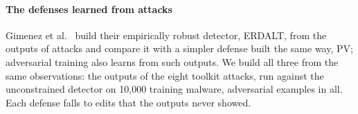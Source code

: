 
\paragraph{The defenses learned from attacks}
Gimenez et al.~\cite{gimenez2025certifiably} build their empirically robust detector, ERDALT, from the outputs of
attacks and compare it with a simpler defense built the same way, PV; adversarial training also learns from such
outputs. We build all three from the same observations: the outputs of the eight toolkit attacks, run against the
unconstrained detector on 10,000 training malware,  adversarial examples in all. Each
defense falls to edits that the outputs never showed.


